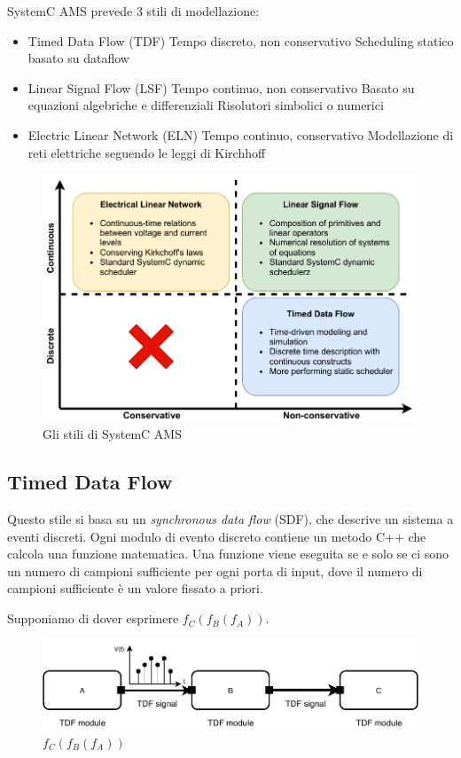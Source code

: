 \documentclass[10pt,a4paper,oneside]{scrbook}
\begin{document}
SystemC AMS prevede 3 stili di modellazione:
\begin{itemize}
    \item Timed Data Flow (TDF)
    \subitem Tempo discreto, non conservativo
    \subitem Scheduling statico basato su dataflow
    \item Linear Signal Flow (LSF)
    \subitem Tempo continuo, non conservativo
    \subitem Basato su equazioni algebriche e differenziali
    \subitem Risolutori simbolici o numerici
    \item Electric Linear Network (ELN)
    \subitem Tempo continuo, conservativo
    \subitem Modellazione di reti elettriche seguendo le leggi di Kirchhoff
\end{itemize}

\begin{figure}[h]
\centering
\includegraphics[width=1\linewidth]{"img/ams styles"}
\caption{Gli stili di SystemC AMS}
\label{fig:ams-styles}
\end{figure}

\subsection{Timed Data Flow}
Questo stile si basa su un \textit{synchronous data flow} (SDF), che descrive un sistema a eventi discreti.
Ogni modulo di evento discreto contiene un metodo C++ che calcola una funzione matematica.
Una funzione viene eseguita se e solo se ci sono un numero di campioni sufficiente per ogni porta di input, dove il
numero di campioni sufficiente è un valore fissato a priori.

Supponiamo di dover esprimere $f_C(f_B(f_A))$.
\begin{figure}[h]
\centering
\includegraphics[width=1\linewidth]{"img/tdf"}
\caption{$f_C(f_B(f_A))$}
\label{fig:tdf}
\end{figure}
\end{document}

